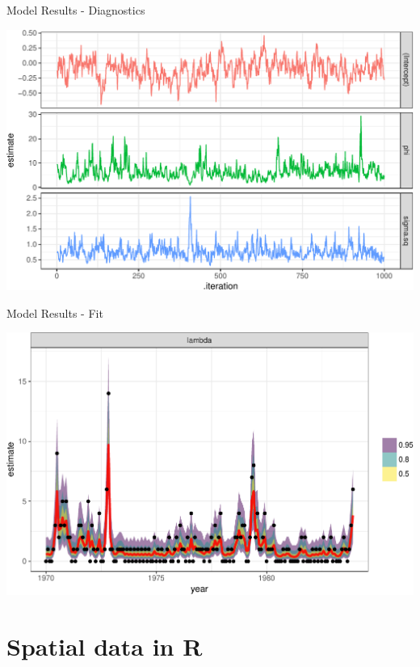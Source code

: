 \documentclass[11pt,ignorenonframetext,]{beamer}
\begin{document}
\begin{frame}{Model Results - Diagnostics}
\protect\hypertarget{model-results---diagnostics-1}{}

\begin{center}\includegraphics[width=\textwidth]{Lec15_files/figure-beamer/unnamed-chunk-6-1} \end{center}

\end{frame}

\begin{frame}{Model Results - Fit}
\protect\hypertarget{model-results---fit-1}{}

\begin{center}\includegraphics[width=\textwidth]{Lec15_files/figure-beamer/unnamed-chunk-7-1} \end{center}

\end{frame}

\hypertarget{spatial-data-in-r}{%
\section{Spatial data in R}\label{spatial-data-in-r}}
\end{document}
